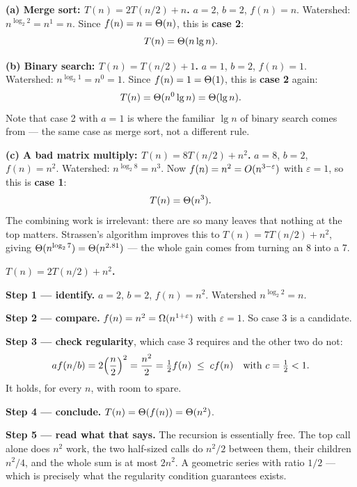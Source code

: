 \begin{worked}
\textbf{(a) Merge sort: $T(n) = 2T(n/2) + n$.}
$a = 2$, $b = 2$, $f(n) = n$. Watershed: $n^{\log_{2} 2} = n^{1} = n$. Since
$f(n) = n = \Theta(n)$, this is \textbf{case 2}:
\[ T(n) = \Theta(n \operatorname{lg} n). \]

\smallskip
\textbf{(b) Binary search: $T(n) = T(n/2) + 1$.}
$a = 1$, $b = 2$, $f(n) = 1$. Watershed: $n^{\log_{2} 1} = n^{0} = 1$. Since
$f(n) = 1 = \Theta(1)$, this is \textbf{case 2} again:
\[ T(n) = \Theta(n^{0} \operatorname{lg} n) = \Theta(\operatorname{lg} n). \]
Note that case 2 with $a = 1$ is where the familiar $\lg n$ of binary search
comes from --- the same case as merge sort, not a different rule.

\smallskip
\textbf{(c) A bad matrix multiply: $T(n) = 8T(n/2) + n^{2}$.}
$a = 8$, $b = 2$, $f(n) = n^{2}$. Watershed: $n^{\log_{2} 8} = n^{3}$. Now
$f(n) = n^{2} = O(n^{3 - \varepsilon})$ with $\varepsilon = 1$, so this is
\textbf{case 1}:
\[ T(n) = \Theta(n^{3}). \]
The combining work is irrelevant: there are so many leaves that nothing at the
top matters. Strassen's algorithm improves this to $T(n) = 7T(n/2) + n^{2}$,
giving $\Theta(n^{\log_{2} 7}) = \Theta(n^{2.81})$ --- the whole gain comes
from turning an 8 into a 7.
\end{worked}

\begin{worked}
\textbf{$T(n) = 2T(n/2) + n^{2}$.}

\smallskip
\textbf{Step 1 --- identify.} $a = 2$, $b = 2$, $f(n) = n^{2}$. Watershed
$n^{\log_{2} 2} = n$.

\smallskip
\textbf{Step 2 --- compare.} $f(n) = n^{2} = \Omega(n^{1 + \varepsilon})$ with
$\varepsilon = 1$. So case 3 is a candidate.

\smallskip
\textbf{Step 3 --- check regularity}, which case 3 requires and the other two
do not:
\[ a f(n/b) = 2\Bigl(\frac{n}{2}\Bigr)^{2} = \frac{n^{2}}{2}
   = \tfrac12 f(n) \;\le\; c f(n) \quad\text{with } c = \tfrac12 < 1. \]
It holds, for every $n$, with room to spare.

\smallskip
\textbf{Step 4 --- conclude.} $T(n) = \Theta(f(n)) = \Theta(n^{2})$.

\smallskip
\textbf{Step 5 --- read what that says.} The recursion is essentially free. The
top call alone does $n^{2}$ work, the two half-sized calls do $n^{2}/2$
between them, their children $n^{2}/4$, and the whole sum is at most $2n^{2}$.
A geometric series with ratio $1/2$ --- which is precisely what the regularity
condition guarantees exists.
\end{worked}


